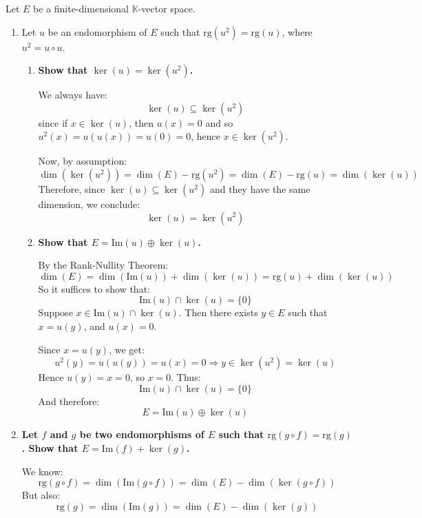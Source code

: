 \documentclass[12pt]{article}
\begin{document}
\begin{answerbox}
Let $ E $ be a finite-dimensional $ \mathbb{K} $-vector space.

\begin{enumerate}

\item Let $ u $ be an endomorphism of $ E $ such that $ \mathrm{rg}(u^2) = \mathrm{rg}(u) $, where $ u^2 = u \circ u $.

    \begin{enumerate}
        \item \textbf{Show that $ \ker(u) = \ker(u^2) $.}
        
        We always have:
        $$
        \ker(u) \subseteq \ker(u^2)
        $$
        since if $ x \in \ker(u) $, then $ u(x) = 0 $ and so $ u^2(x) = u(u(x)) = u(0) = 0 $, hence $ x \in \ker(u^2) $.
        
        Now, by assumption: 
        $$
        \dim(\ker(u^2)) = \dim(E) - \mathrm{rg}(u^2) = \dim(E) - \mathrm{rg}(u) = \dim(\ker(u))
        $$
        Therefore, since $ \ker(u) \subseteq \ker(u^2) $ and they have the same dimension, we conclude:
        $$
        \ker(u) = \ker(u^2)
        $$

        \item \textbf{Show that $ E = \mathrm{Im}(u) \oplus \ker(u) $.}
        
        By the Rank-Nullity Theorem:
        $$
        \dim(E) = \dim(\mathrm{Im}(u)) + \dim(\ker(u)) = \mathrm{rg}(u) + \dim(\ker(u))
        $$
        So it suffices to show that:
        $$
        \mathrm{Im}(u) \cap \ker(u) = \{0\}
        $$
        Suppose $ x \in \mathrm{Im}(u) \cap \ker(u) $. Then there exists $ y \in E $ such that $ x = u(y) $, and $ u(x) = 0 $.

        Since $ x = u(y) $, we get:
        $$
        u^2(y) = u(u(y)) = u(x) = 0 \Rightarrow y \in \ker(u^2) = \ker(u)
        $$
        Hence $ u(y) = x = 0 $, so $ x = 0 $. Thus:
        $$
        \mathrm{Im}(u) \cap \ker(u) = \{0\}
        $$
        And therefore:
        $$
        E = \mathrm{Im}(u) \oplus \ker(u)
        $$
    \end{enumerate}

\item \textbf{Let $ f $ and $ g $ be two endomorphisms of $ E $ such that $ \mathrm{rg}(g \circ f) = \mathrm{rg}(g) $. Show that $ E = \mathrm{Im}(f) + \ker(g) $.}

We know:
$$
\mathrm{rg}(g \circ f) = \dim(\mathrm{Im}(g \circ f)) = \dim(E) - \dim(\ker(g \circ f))
$$
But also:
$$
\mathrm{rg}(g) = \dim(\mathrm{Im}(g)) = \dim(E) - \dim(\ker(g))
$$


\end{enumerate}
\end{answerbox}
\end{document}

